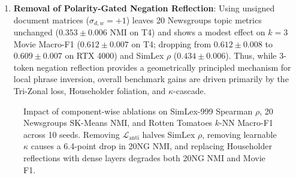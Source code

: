 \documentclass[journal]{IEEEtran}
\begin{document}
\begin{enumerate}
    \item \textbf{Removal of Polarity-Gated Negation Reflection}: Using unsigned document matrices ($\sigma_{d,w} = +1$) leaves 20 Newsgroups topic metrics unchanged ($0.353 \pm 0.006$ NMI on T4) and shows a modest effect on $k=3$ Movie Macro-F1 ($0.612 \pm 0.007$ on T4; dropping from $0.612 \pm 0.008$ to $0.609 \pm 0.007$ on RTX 4000) and SimLex $\rho$ ($0.434 \pm 0.006$). Thus, while 3-token negation reflection provides a geometrically principled mechanism for local phrase inversion, overall benchmark gains are driven primarily by the Tri-Zonal loss, Householder foliation, and $\kappa$-cascade.
\end{enumerate}

\begin{figure}[!t]
\centering
{}
\caption{Impact of component-wise ablations on SimLex-999 Spearman $\rho$, 20 Newsgroups SK-Means NMI, and Rotten Tomatoes $k$-NN Macro-F1 across 10 seeds. Removing $\mathcal{L}_{\text{anti}}$ halves SimLex $\rho$, removing learnable $\kappa$ causes a 6.4-point drop in 20NG NMI, and replacing Householder reflections with dense layers degrades both 20NG NMI and Movie F1.}
\label{fig:ablation_chart}
\end{figure}
\end{document}
